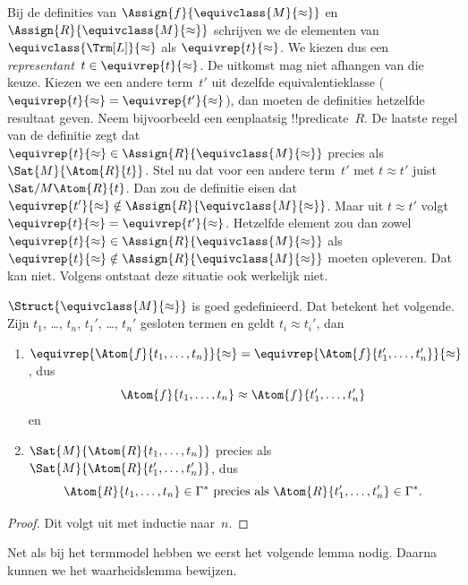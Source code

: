 \documentclass[openany]{memoir}
\begin{document}
\begin{explain}
Bij de definities van $\Assign{f}{\equivclass{M}{\approx}}$ en
$\Assign{R}{\equivclass{M}{\approx}}$ schrijven we de elementen van
$\equivclass{\Trm[L]}{\approx}$ als $\equivrep{t}{\approx}$. We kiezen
dus een \emph{representant}~$t \in \equivrep{t}{\approx}$. De uitkomst
mag niet afhangen van die keuze. Kiezen we een andere term~$t'$ uit
dezelfde equivalentieklasse
($\equivrep{t}{\approx} = \equivrep{t'}{\approx}$), dan moeten de
definities hetzelfde resultaat geven. Neem bijvoorbeeld een eenplaatsig
!!{predicate}~$R$. De laatste regel van de definitie zegt dat
$\equivrep{t}{\approx} \in \Assign{R}{\equivclass{M}{\approx}}$ precies
als $\Sat{M}{\Atom{R}{t}}$. Stel nu dat voor een andere term~$t'$ met
$t \approx t'$ juist $\Sat/{M}{\Atom{R}{t}}$. Dan zou de definitie eisen
dat $\equivrep{t'}{\approx} \notin
\Assign{R}{\equivclass{M}{\approx}}$. Maar uit $t \approx t'$ volgt
$\equivrep{t}{\approx} = \equivrep{t'}{\approx}$. Hetzelfde element zou
dan zowel $\equivrep{t}{\approx} \in
\Assign{R}{\equivclass{M}{\approx}}$ als $\equivrep{t}{\approx} \notin
\Assign{R}{\equivclass{M}{\approx}}$ moeten opleveren. Dat kan niet.
Volgens  ontstaat deze situatie ook werkelijk
niet.
\end{explain}

\begin{prop}
$\Struct{\equivclass{M}{\approx}}$ is goed gedefinieerd. Dat betekent het
volgende. Zijn $t_1$, \dots, $t_n$, $t_1'$, \dots, $t_n'$ gesloten termen
en geldt $t_i \approx t_i'$, dan
\begin{enumerate}
\item $\equivrep{\Atom{f}{t_1,\dots, t_n}}{\approx} =
    \equivrep{\Atom{f}{t_1',\dots, t_n'}}{\approx}$, dus
  \[
  \Atom{f}{t_1,\dots, t_n} \approx \Atom{f}{t_1',\dots, t_n'}
  \]
  en
\item $\Sat{M}{\Atom{R}{t_1,\dots, t_n}}$ precies als
  $\Sat{M}{\Atom{R}{t_1',\dots, t_n'}}$, dus
  \[
    \Atom{R}{t_1,\dots, t_n} \in \Gamma^* \text{ precies als }
    \Atom{R}{t_1',\dots, t_n'} \in \Gamma^*.
  \]
\end{enumerate}
\end{prop}

\begin{proof}
Dit volgt uit  met inductie naar~$n$.
\end{proof}

Net als bij het termmodel hebben we eerst het volgende lemma nodig. Daarna
kunnen we het waarheidslemma bewijzen.
\end{document}
